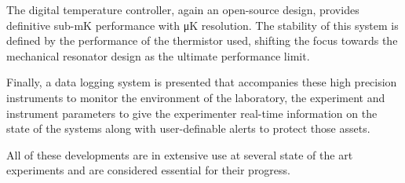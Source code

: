The digital temperature controller, again an open-source design, provides definitive sub-\unit{\milli\kelvin} performance with \unit{\micro\kelvin} resolution. The stability of this system is defined by the performance of the thermistor used, shifting the focus towards the mechanical resonator design as the ultimate performance limit.

Finally, a data logging system is presented that accompanies these high precision instruments to monitor the environment of the laboratory, the experiment and instrument parameters to give the experimenter real-time information on the state of the systems along with user-definable alerts to protect those assets.

All of these developments are in extensive use at several state of the art experiments and are considered essential for their progress.
